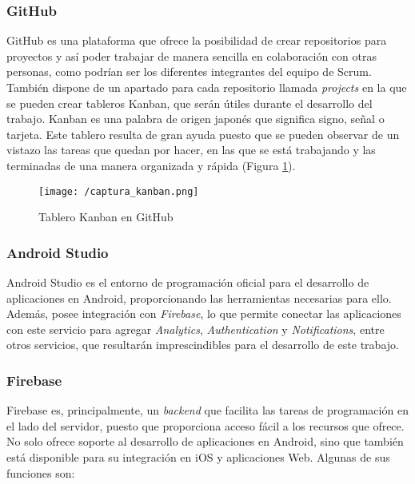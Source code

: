 \subsubsection*{GitHub}
GitHub es una plataforma que ofrece la posibilidad de crear repositorios para proyectos y así poder trabajar de manera sencilla en colaboración con otras personas, como podrían ser los diferentes integrantes del equipo de Scrum. También dispone de un apartado para cada repositorio llamada \textit{projects} en la que se pueden crear tableros Kanban, que serán útiles durante el desarrollo del trabajo. Kanban \cite{Gomez2017} es una palabra de origen japonés que significa signo, señal o tarjeta. Este tablero resulta de gran ayuda puesto que se pueden observar de un vistazo las tareas que quedan por hacer, en las que se está trabajando y las terminadas de una manera organizada y rápida (Figura \ref{fig:kanban}).

\clearpage

\begin{figure}[!h]
	\begin{center}
		\texttt{[image: /captura\_kanban.png]}
		\caption{Tablero Kanban en GitHub}
		\label{fig:kanban}
	\end{center}
\end{figure}

\subsubsection*{Android Studio}
Android Studio \cite{AndroidStudio} es el entorno de programación oficial para el desarrollo de aplicaciones en Android, proporcionando las herramientas necesarias para ello. Además, posee integración con \textit{Firebase}, lo que permite conectar las aplicaciones con este servicio para agregar \textit{Analytics}, \textit{Authentication} y \textit{Notifications}, entre otros servicios, que resultarán imprescindibles para el desarrollo de este trabajo.

\subsubsection*{Firebase}
Firebase \cite{GooFirebase} es, principalmente, un \textit{backend} que facilita las tareas de programación en el lado del servidor, puesto que proporciona acceso fácil a los recursos que ofrece. No solo ofrece soporte al desarrollo de aplicaciones en Android, sino que también está disponible para su integración en iOS y aplicaciones Web. Algunas de sus funciones son:

